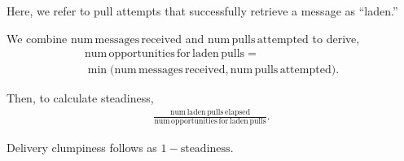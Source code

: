 Here, we refer to pull attempts that successfully retrieve a message as ``laden.''

We combine $\mathrm{num\,messages\,received}$ and $\mathrm{num\,pulls\,attempted}$ to derive,
\begin{align*}
  \mathrm{num\,opportunities\,for\,laden\,pulls} = \\
   \min\Big(\mathrm{num\,messages\,received}, \mathrm{num\,pulls\,attempted}\Big).
\end{align*}

Then, to calculate steadiness,
\begin{align*}
  \frac{
    \mathrm{num\,laden\,pulls\,elapsed}
  }{
    \mathrm{num\,opportunities\,for\,laden\,pulls}
  }.
\end{align*}

Delivery clumpiness follows as $1 - \mathrm{steadiness}$.
